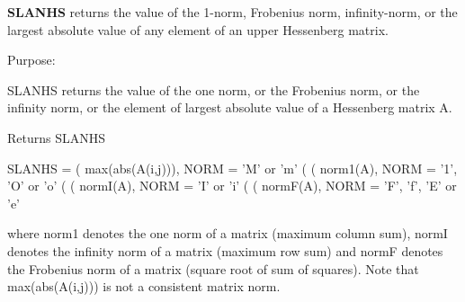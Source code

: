 {\bfseries S\+L\+A\+N\+H\+S} returns the value of the 1-\/norm, Frobenius norm, infinity-\/norm, or the largest absolute value of any element of an upper Hessenberg matrix. 

 \begin{DoxyParagraph}{Purpose\+: }
\begin{DoxyVerb} SLANHS  returns the value of the one norm,  or the Frobenius norm, or
 the  infinity norm,  or the  element of  largest absolute value  of a
 Hessenberg matrix A.\end{DoxyVerb}

\end{DoxyParagraph}
\begin{DoxyReturn}{Returns}
S\+L\+A\+N\+H\+S \begin{DoxyVerb}    SLANHS = ( max(abs(A(i,j))), NORM = 'M' or 'm'
             (
             ( norm1(A),         NORM = '1', 'O' or 'o'
             (
             ( normI(A),         NORM = 'I' or 'i'
             (
             ( normF(A),         NORM = 'F', 'f', 'E' or 'e'

 where  norm1  denotes the  one norm of a matrix (maximum column sum),
 normI  denotes the  infinity norm  of a matrix  (maximum row sum) and
 normF  denotes the  Frobenius norm of a matrix (square root of sum of
 squares).  Note that  max(abs(A(i,j)))  is not a consistent matrix norm.\end{DoxyVerb}
 
\end{DoxyReturn}

